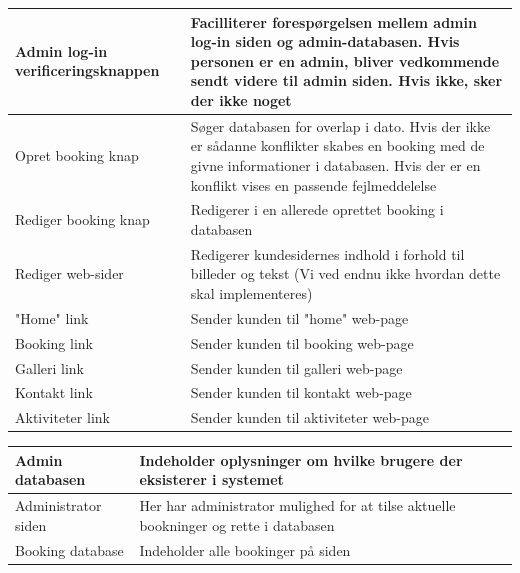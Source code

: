 \documentclass[12pt,a4paper]{article}
\begin{document}
\begin{minipage}{\textwidth}

 \label{tab:title}
\begin{tabular}{| p{5cm} | p{10cm} |}
\hline Admin log-in \newline verificeringsknappen & Facilliterer forespørgelsen mellem admin log-in siden og admin-databasen. Hvis personen er en admin, bliver vedkommende sendt videre til admin siden. Hvis ikke, sker der ikke noget\\
\hline Opret booking knap & Søger databasen for overlap i dato. Hvis der ikke er sådanne konflikter skabes en booking med de givne informationer i databasen. Hvis der er en konflikt vises en passende fejlmeddelelse \\
\hline Rediger booking knap & Redigerer i en allerede oprettet booking i databasen \\
\hline Rediger web-sider & Redigerer kundesidernes indhold i forhold til billeder og tekst (Vi ved endnu ikke hvordan dette skal implementeres) \\
\hline "Home" link & Sender kunden til "home" web-page \\
\hline Booking link & Sender kunden til booking web-page \\
\hline Galleri link & Sender kunden til galleri web-page \\
\hline Kontakt link & Sender kunden til kontakt web-page \\
\hline Aktiviteter link & Sender kunden til aktiviteter web-page \\
\hline
\end{tabular}

\end{minipage}

\bigskip

\begin{minipage}{\textwidth}

 \label{tab:title}
\begin{tabular}{| p{5cm} | p{10cm} |}
\hline Admin databasen & Indeholder oplysninger om hvilke brugere der eksisterer i systemet \\
\hline Administrator siden & Her har administrator mulighed for at tilse aktuelle bookninger og rette i databasen \\
\hline Booking database & Indeholder alle bookinger på siden \\
\hline
\end{tabular}

\end{minipage}
\newpage
\end{document}
